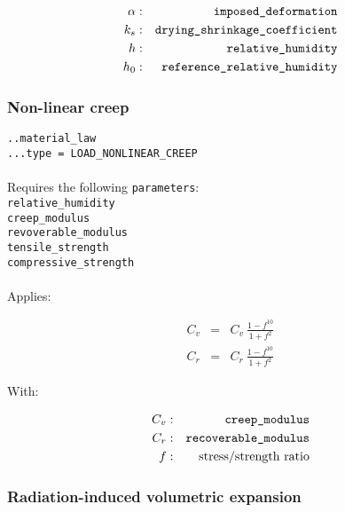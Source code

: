 \documentclass[10pt]{article}
\begin{document}
\begin{eqnarray}
	\alpha & : & \verb+imposed_deformation+ \notag \\
	k_s & : & \verb+drying_shrinkage_coefficient+\notag  \\
	h & : & \verb+relative_humidity+ \notag \\
	h_0 & : & \verb+reference_relative_humidity+ \notag 
\end{eqnarray}

\subsubsection{Non-linear creep}

\noindent \verb+..material_law+\\
\verb+...type = LOAD_NONLINEAR_CREEP+

\paragraph{}Requires the following \verb+parameters+:\\

\noindent \verb+relative_humidity+\\
\verb+creep_modulus+\\
\verb+revoverable_modulus+\\
\verb+tensile_strength+\\
\verb+compressive_strength+

\paragraph{}Applies:

\begin{eqnarray}
	C_v & = & C_v\ \frac{1-f^{10}}{1+f^2} \\
	C_r & = & C_r\ \frac{1-f^{10}}{1+f^2}
\end{eqnarray}

With:

\begin{eqnarray}
	C_v & : & \verb+creep_modulus+ \notag \\
	C_r & : & \verb+recoverable_modulus+ \notag \\
	f & : & \text{stress/strength ratio} \notag  \\
\end{eqnarray}


\subsubsection{Radiation-induced volumetric expansion}
\end{document}
